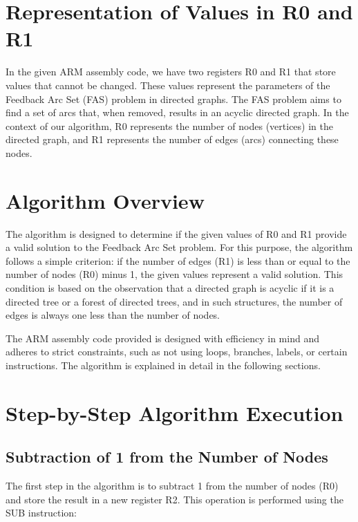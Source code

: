 




\section{Representation of Values in R0 and R1}

In the given ARM assembly code, we have two registers R0 and R1 that store values that cannot be changed. These values represent the parameters of the Feedback Arc Set (FAS) problem in directed graphs. The FAS problem aims to find a set of arcs that, when removed, results in an acyclic directed graph. In the context of our algorithm, R0 represents the number of nodes (vertices) in the directed graph, and R1 represents the number of edges (arcs) connecting these nodes.

\section{Algorithm Overview}

The algorithm is designed to determine if the given values of R0 and R1 provide a valid solution to the Feedback Arc Set problem. For this purpose, the algorithm follows a simple criterion: if the number of edges (R1) is less than or equal to the number of nodes (R0) minus 1, the given values represent a valid solution. This condition is based on the observation that a directed graph is acyclic if it is a directed tree or a forest of directed trees, and in such structures, the number of edges is always one less than the number of nodes.

The ARM assembly code provided is designed with efficiency in mind and adheres to strict constraints, such as not using loops, branches, labels, or certain instructions. The algorithm is explained in detail in the following sections.

\section{Step-by-Step Algorithm Execution}

\subsection{Subtraction of 1 from the Number of Nodes}

The first step in the algorithm is to subtract 1 from the number of nodes (R0) and store the result in a new register R2. This operation is performed using the SUB instruction:

